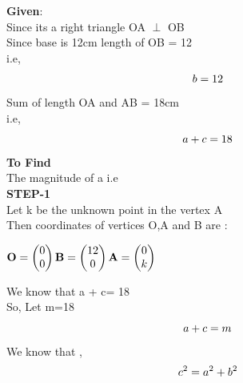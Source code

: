 \documentclass[10pt,a4paper]{report}
\let\vec\mathbf
\begin{document}
\begin{multicols}{2}
\raggedright \textbf{Given}:\vspace{2mm}\\
Since its a right triangle OA $\perp$ OB \\\vspace{2mm}
Since base is 12cm length of OB = 12  \\i.e,\\
\begin{equation}
b= 12 \vspace{2mm}
\end{equation}
Sum of length OA and AB = 18cm \\ i.e,\\
\begin{equation}
a + c= 18 \vspace{2mm}
\end{equation}
\textbf{To Find}\vspace{2mm}\\
The magnitude of a \hspace{2mm} i.e \\ \vspace{2mm}
\textbf{STEP-1}\vspace{2mm}\\
Let k be the unknown point in the vertex A \vspace{2mm}\\
Then coordinates of vertices  O,A and B are :\vspace{2mm}\\
\begin{center}$
\vec{
 O =\begin{pmatrix}
0 \\
0 
\end{pmatrix} 
\vspace{1mm}
B=\begin{pmatrix}
12 \\
0 
\end{pmatrix} 
\vspace{1mm}
A=\begin{pmatrix}
0 \\
k 
\end{pmatrix} }
\vspace{1mm}$
\end{center}

\vspace{3mm} 
We know that a + c= 18 \vspace{2mm}\\
So, Let m=18 
\begin{equation}
   a +c = m \vspace{2mm}
\end{equation}
We know that , \\
\begin{equation}
c^2 = a^2 + b^2 \vspace{2mm}
\end{equation}


\end{multicols}
\end{document}
